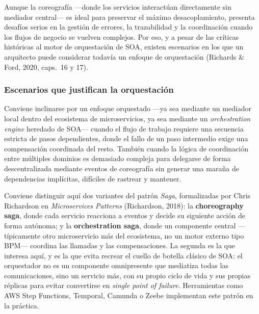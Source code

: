 
Aunque la coreografía ---donde los servicios interactúan directamente sin mediador
central--- es ideal para preservar el máximo desacoplamiento, presenta desafíos serios
en la gestión de errores, la trazabilidad y la coordinación cuando los flujos de
negocio se vuelven complejos. Por eso, y a pesar de las críticas históricas al motor
de orquestación de SOA, existen escenarios en los que un arquitecto puede considerar
todavía un enfoque de orquestación (Richards \& Ford, 2020, caps.~16 y 17).

\subsubsection{Escenarios que justifican la orquestación}

Conviene inclinarse por un enfoque orquestado ---ya sea mediante un mediador local
dentro del ecosistema de microservicios, ya sea mediante un \emph{orchestration
engine} heredado de SOA--- cuando el flujo de trabajo requiere una secuencia estricta
de pasos dependientes, donde el fallo de un paso intermedio exige una compensación
coordinada del resto. También cuando la lógica de coordinación entre múltiples
dominios es demasiado compleja para delegarse de forma descentralizada mediante
eventos de coreografía sin generar una maraña de dependencias implícitas, difíciles
de rastrear y mantener.

Conviene distinguir aquí dos variantes del patrón \emph{Saga}, formalizadas por Chris
Richardson en \emph{Microservices Patterns} (Richardson, 2018): la \textbf{choreography
saga}, donde cada servicio reacciona a eventos y decide su siguiente acción de forma
autónoma; y la \textbf{orchestration saga}, donde un componente central ---típicamente
otro microservicio más del ecosistema, no un motor externo tipo BPM--- coordina las
llamadas y las compensaciones. La segunda es la que interesa aquí, y es la que evita
recrear el cuello de botella clásico de SOA: el orquestador no es un componente
omnipresente que mediatiza todas las comunicaciones, sino un servicio más, con su
propio ciclo de vida y sus propias réplicas para evitar convertirse en \emph{single
point of failure}. Herramientas como AWS Step Functions, Temporal, Camunda o Zeebe
implementan este patrón en la práctica.

